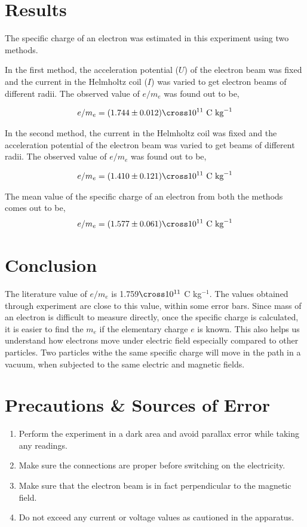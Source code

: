 \section{Results}
The specific charge of an electron was estimated in this experiment using two methods. 

In the first method, the acceleration potential ($U$) of the electron beam was fixed and the current in the Helmholtz coil ($I$) was varied to get electron beams of different radii. The observed value of $e/m_e$ was found out to be,

\begin{align*}
    e/m_e = (1.744\pm0.012)\cross10^{11} \text{ C kg}^{-1}
\end{align*}

In the second method, the current in the Helmholtz coil was fixed and the acceleration potential of the electron beam was varied to get beams of different radii. The observed value of $e/m_e$ was found out to be,

\begin{align*}
    e/m_e = (1.410\pm0.121)\cross10^{11} \text{ C kg}^{-1}
\end{align*}

The mean value of the specific charge of an electron from both the methods comes out to be,
\begin{align*}
    e/m_e = (1.577\pm0.061)\cross10^{11} \text{ C kg}^{-1}
\end{align*}


\section{Conclusion}
The literature value of $e/m_e$ is 1.759$\cross10^{11}$ C kg$^{-1}$. The values obtained through experiment are close to this value, within some error bars. Since mass of an electron is difficult to measure directly, once the specific charge is calculated, it is easier to find the $m_e$ if the elementary charge $e$ is known. 
This also helps us understand how electrons move under electric field especially compared to other particles. Two particles withe the same specific charge will move in the path in a vacuum, when subjected to the same electric and magnetic fields.

\section{Precautions \& Sources of Error}
\begin{enumerate}
    \item Perform the experiment in a dark area and avoid parallax error while taking any readings.
    \item Make sure the connections are proper before switching on the electricity.
    \item Make sure that the electron beam is in fact perpendicular to the magnetic field.
    \item Do not exceed any current or voltage values as cautioned in the apparatus.
\end{enumerate}